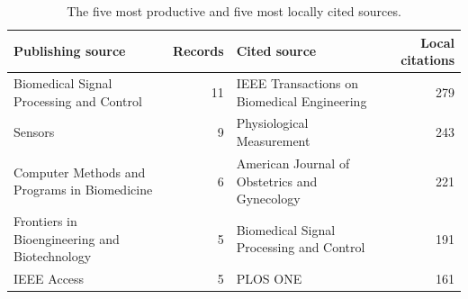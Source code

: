 \begin{table}[!t]
\caption{The five most productive and five most locally cited sources.}
\label{tab:sources}
\centering
\footnotesize
\begin{tabularx}{\textwidth}{@{}YrYr@{}}
\toprule
Publishing source & Records & Cited source & Local citations \\
\midrule
Biomedical Signal Processing and Control & 11 & IEEE Transactions on Biomedical Engineering & 279 \\
Sensors & 9 & Physiological Measurement & 243 \\
Computer Methods and Programs in Biomedicine & 6 & American Journal of Obstetrics and Gynecology & 221 \\
Frontiers in Bioengineering and Biotechnology & 5 & Biomedical Signal Processing and Control & 191 \\
IEEE Access & 5 & PLOS ONE & 161 \\
\bottomrule
\end{tabularx}
\end{table}
